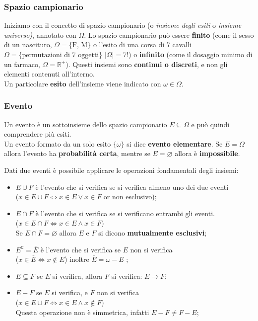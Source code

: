 \subsubsection{Spazio campionario}
Iniziamo con il concetto di {spazio campionario} (o \textit{insieme degli esiti} o \textit{insieme universo)}, annotato con $\Omega$. 
Lo spazio campionario può essere \textbf{finito} (come il sesso di un nascituro, $\Omega = \{ \text{F}, \, \text{M} \}$ o l'esito di una corsa di 7 cavalli $\Omega = \{ \text{permutazioni di 7 oggetti} \}$ $|\Omega| = 7!$) o \textbf{infinito} (come il dosaggio minimo di un farmaco, $\Omega = \mathbb{R}^+$). Questi insiemi sono \textbf{continui o discreti}, e non gli elementi contenuti all'interno. \\ Un particolare \textbf{esito} dell'insieme viene indicato con $\omega \in \Omega$.


\subsubsection{Evento} 
Un evento è un sottoinsieme dello spazio campionario $E \subseteq \Omega$ e può quindi comprendere più esiti. \\ Un evento formato da un solo esito $\{ \omega \}$ si dice \textbf{evento elementare}.
Se $E = \Omega$ allora l'evento ha \textbf{probabilità certa}, mentre se $E = \varnothing$ allora è \textbf{impossibile}.

\noindent Dati due eventi è possibile applicare le operazioni fondamentali degli insiemi: \begin{itemize}
    \item $E \cup F$ è l'evento che si verifica se si verifica almeno uno dei due eventi \\ ($x \in E \cup F \Leftrightarrow x \in E \lor x \in F$ or non esclusivo);
    \item $E \cap F$ è l'evento che si verifica se si verificano entrambi gli eventi. \\ ($x \in E \cap F \Leftrightarrow x \in E \land x \in F$) \\ Se $E \cap F = \varnothing$ allora $E$ e $F$ si dicono \textbf{mutualmente esclusivi};
    \item $E^\mathtt{C} = \overline E$ è l'evento che si verifica se $E$ non si verifica \\ ($x \in \overline E \Leftrightarrow x \notin E $) inoltre $\overline E = \omega - E$ ;
    \item $E \subseteq F$ se $E$ si verifica, allora $F$ si verifica: $E \rightarrow F$;
    \item $E - F$ se $E$ si verifica, e $F$ non si verifica \\ ($x \in E \cup F \Leftrightarrow x \in E \land x \notin F$) \\ Questa operazione non è simmetrica, infatti $E - F \neq F - E$;
\end{itemize}

